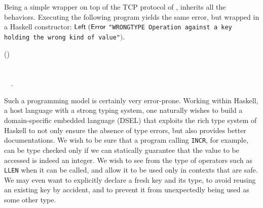 Being a simple wrapper on top of the TCP protocol of \Redis{}, \Hedis{}
inherits all the behaviors. Executing the following program yields the same
error, but wrapped in a Haskell constructor: \ensuremath{\Conid{Left}\;(\Conid{Error}} \texttt{"WRONGTYPE
Operation against a key holding the wrong kind of value"}\ensuremath{)}.
\begin{hscode}\SaveRestoreHook
{}%
%
%
\>[B]{}\mathbin{::}\;(\;\;){}\<[E]%
\\
\>[B]{}\mathrel{=}\<[E]%
\\
\>[B]{}\<[5]%
\>[5]{}\;\;\<[E]%
\\
\>[B]{}\<[5]%
\>[5]{}\;~~.{}\<[E]%
\ColumnHook
\end{hscode}\resethooks

Such a programming model is certainly very error-prone. Working within Haskell,
a host language with a strong typing system, one naturally wishes to build a
domain-specific embedded language (DSEL) that exploits the rich type system
of Haskell to not only ensure the absence of \Redis{} type errors, but also
provides better documentations. We wish to be sure that a program calling
\texttt{INCR}, for example, can be type checked only if we can statically
guarantee that the value to be accessed is indeed an integer. We wish to see
from the type of operators such as \texttt{LLEN} when it can be called, and
allow it to be used only in contexts that are safe. We may even want to
explicitly declare a fresh key and its type, to avoid reusing an existing key
by accident, and to prevent it from unexpectedly being used as some other type.


